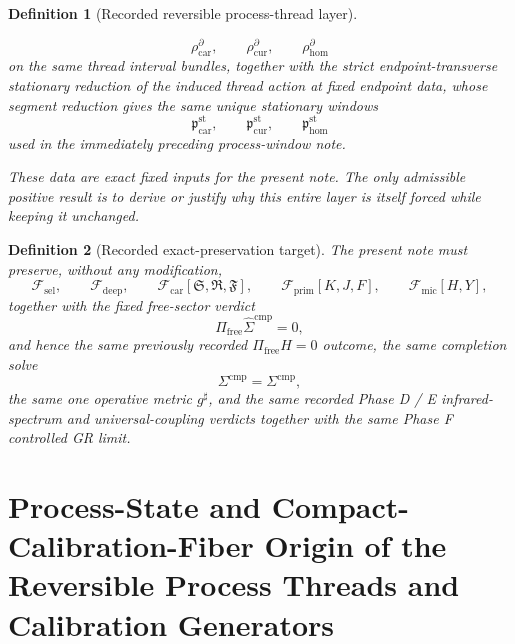 \documentclass[11pt]{article}
\newcommand{\CompletedMetric}{g^{\sharp}}
\newcommand{\CompShift}{\Sigma^{\mathrm{cmp}}}
\newcommand{\CompLift}{\widehat\Sigma^{\mathrm{cmp}}}
\newcommand{\FreeProj}{\Pi_{\mathrm{free}}}
\newcommand{\GaugeAux}{Y}
\newcommand{\MicFunctional}{\mathscr F_{\mathrm{mic}}}
\newcommand{\PrimFunctional}{\mathscr F_{\mathrm{prim}}}
\newcommand{\CarrierFunctional}{\mathscr F_{\mathrm{car}}}
\newcommand{\DeepFunctional}{\mathscr F_{\mathrm{deep}}}
\newcommand{\StemFunctional}{\mathscr F_{\mathrm{sel}}}
\newcommand{\PrimStrain}{K}
\newcommand{\PrimNeutral}{J}
\newcommand{\PrimFree}{F}
\newcommand{\CarrierSeed}{\mathfrak S}
\newcommand{\RelabelSeed}{\mathfrak R}
\newcommand{\FreeSeed}{\mathfrak F}
\newcommand{\TensorStationaryWindow}{\mathfrak p_{\mathrm{car}}^{\mathrm{st}}}
\newcommand{\CurStationaryWindow}{\mathfrak p_{\mathrm{cur}}^{\mathrm{st}}}
\newcommand{\HomStationaryWindow}{\mathfrak p_{\mathrm{hom}}^{\mathrm{st}}}
\newcommand{\TensorBoundaryRecorder}{\rho_{\mathrm{car}}^{\partial}}
\newcommand{\CurBoundaryRecorder}{\rho_{\mathrm{cur}}^{\partial}}
\newcommand{\HomBoundaryRecorder}{\rho_{\mathrm{hom}}^{\partial}}
\newtheorem{definition}{Definition}
\begin{document}
\begin{definition}[Recorded reversible process-thread layer]
\begin{enumerate}
    \[
    \TensorBoundaryRecorder,\qquad
    \CurBoundaryRecorder,\qquad
    \HomBoundaryRecorder
    \]
    on the same thread interval bundles, together with the strict endpoint-transverse stationary reduction of the induced thread action at fixed endpoint data, whose segment reduction gives the same unique stationary windows
    \[
    \TensorStationaryWindow,\qquad
    \CurStationaryWindow,\qquad
    \HomStationaryWindow
    \]
    used in the immediately preceding process-window note.
\end{enumerate}
These data are exact fixed inputs for the present note. The only admissible positive result is to derive or justify why this entire layer is itself forced while keeping it unchanged.
\end{definition}

\begin{definition}[Recorded exact-preservation target]
\label{def:recorded_target}
The present note must preserve, without any modification,
\begin{equation}
\StemFunctional,
\qquad
\DeepFunctional,
\qquad
\CarrierFunctional[\CarrierSeed,\RelabelSeed,\FreeSeed],
\qquad
\PrimFunctional[\PrimStrain,\PrimNeutral,\PrimFree],
\qquad
\MicFunctional[H,\GaugeAux],
\label{eq:target_functionals}
\end{equation}
together with the fixed free-sector verdict
\begin{equation}
\FreeProj\CompLift=0,
\label{eq:target_free}
\end{equation}
and hence the same previously recorded \(\Pi_{\mathrm{free}}H=0\) outcome, the same completion solve
\begin{equation}
\CompShift=\Sigma^{\mathrm{cmp}},
\label{eq:target_sigma}
\end{equation}
the same one operative metric \(\CompletedMetric\), and the same recorded Phase D / E infrared-spectrum and universal-coupling verdicts together with the same Phase F controlled GR limit.
\end{definition}

\section{Process-State and Compact-Calibration-Fiber Origin of the Reversible Process Threads and Calibration Generators}
\end{document}
